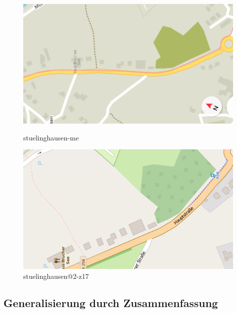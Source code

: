 \documentclass[../main/thesis.tex]{subfiles}
\begin{document}
\begin{figure}[ht]
  \begin{minipage}[t]{.5\linewidth}
    \centering
    \includegraphics[width=\ScaleIfNeeded]{../chapter2/stuelinghausen-me}
    \caption{stuelinghausen-me}\label{fig:stuelinghausen-maps.me}
  \end{minipage}%
  \begin{minipage}[t]{.5\linewidth}
    \centering
    \includegraphics[width=\ScaleIfNeeded]{../chapter2/stuelinghausen@2-z17}
    \caption{stuelinghausen@2-z17}\label{fig:stuelinghausen-mapnik}
  \end{minipage}
\end{figure}



\subsection{Generalisierung durch Zusammenfassung}

	
\end{document}
